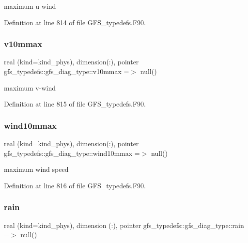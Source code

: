 maximum u-\/wind 



Definition at line 814 of file G\+F\+S\+\_\+typedefs.\+F90.

\mbox{\label{structgfs__typedefs_1_1gfs__diag__type_aa57985e35feea1331a5881d1a1d136d5}} 
\subsubsection{v10mmax}
{\footnotesize\ttfamily real (kind=kind\+\_\+phys), dimension(\+:), pointer gfs\+\_\+typedefs\+::gfs\+\_\+diag\+\_\+type\+::v10mmax =$>$ null()}



maximum v-\/wind 



Definition at line 815 of file G\+F\+S\+\_\+typedefs.\+F90.

\mbox{\label{structgfs__typedefs_1_1gfs__diag__type_a400b065ebb5134026987a619e3b9ac8c}} 
\subsubsection{wind10mmax}
{\footnotesize\ttfamily real (kind=kind\+\_\+phys), dimension(\+:), pointer gfs\+\_\+typedefs\+::gfs\+\_\+diag\+\_\+type\+::wind10mmax =$>$ null()}



maximum wind speed 



Definition at line 816 of file G\+F\+S\+\_\+typedefs.\+F90.

\mbox{\label{structgfs__typedefs_1_1gfs__diag__type_ac46d70a2656e35b18a457962671dc27b}} 
\subsubsection{rain}
{\footnotesize\ttfamily real (kind=kind\+\_\+phys), dimension   (\+:), pointer gfs\+\_\+typedefs\+::gfs\+\_\+diag\+\_\+type\+::rain =$>$ null()}



